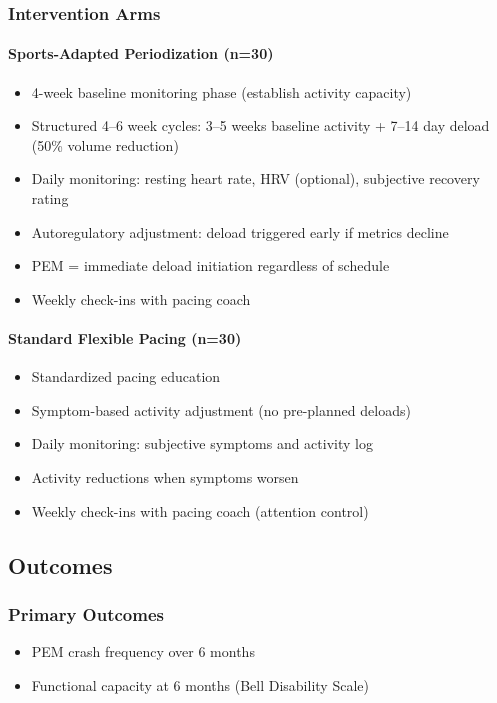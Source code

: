 \subsubsection{Intervention Arms}

\paragraph{Sports-Adapted Periodization (n=30)}
\begin{itemize}
    \item 4-week baseline monitoring phase (establish activity capacity)
    \item Structured 4--6 week cycles: 3--5 weeks baseline activity + 7--14 day deload (50\% volume reduction)
    \item Daily monitoring: resting heart rate, HRV (optional), subjective recovery rating
    \item Autoregulatory adjustment: deload triggered early if metrics decline
    \item PEM = immediate deload initiation regardless of schedule
    \item Weekly check-ins with pacing coach
\end{itemize}

\paragraph{Standard Flexible Pacing (n=30)}
\begin{itemize}
    \item Standardized pacing education
    \item Symptom-based activity adjustment (no pre-planned deloads)
    \item Daily monitoring: subjective symptoms and activity log
    \item Activity reductions when symptoms worsen
    \item Weekly check-ins with pacing coach (attention control)
\end{itemize}

\subsection{Outcomes}

\subsubsection{Primary Outcomes}
\begin{itemize}
    \item PEM crash frequency over 6 months
    \item Functional capacity at 6 months (Bell Disability Scale)
\end{itemize}

